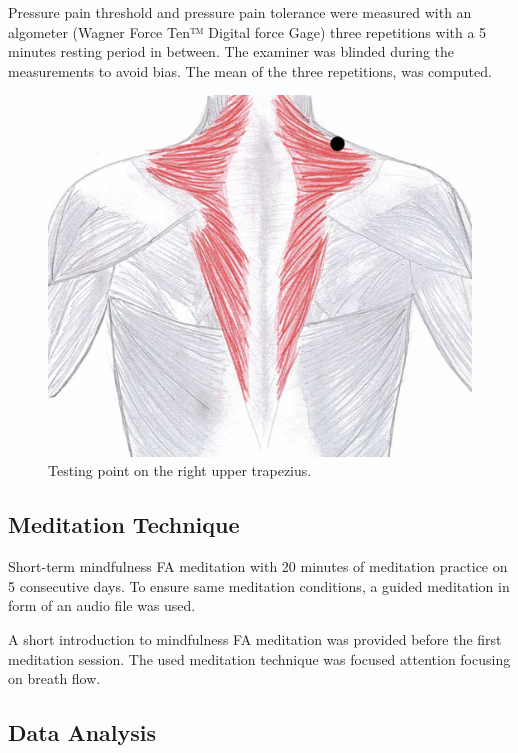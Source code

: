Pressure pain threshold and pressure pain tolerance were measured with an algometer (Wagner Force Ten™ Digital force Gage) three repetitions with a 5 minutes resting period in between. The examiner was blinded during the measurements to avoid bias. The mean of the three repetitions, was computed. 

\begin{figure}[H]
\centering
\includegraphics[width=.7\columnwidth]{../figures/trapezius}
\caption{Testing point on the right upper trapezius.}
\label{fig:trapezius}
\end{figure} \vspace{-.5cm}


\subsection{Meditation Technique}
Short-term mindfulness FA meditation with 20 minutes of meditation practice on 5 consecutive days. To ensure same meditation conditions, a guided meditation in form of an audio file was used. 

A short introduction to mindfulness FA meditation was provided before the first meditation session. The used meditation technique was focused attention focusing on breath flow.

\subsection{Data Analysis}

